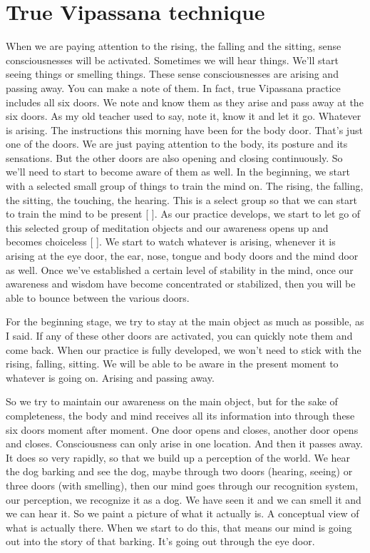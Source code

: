 \documentclass[letterpaper,10pt,english]{sphinxmanual}
\begin{document}
\section{True Vipassana technique}
\label{\detokenize{2-a:true-vipassana-technique}}
\sphinxAtStartPar
When we are paying attention to the rising, the falling and the sitting,
sense  consciousnesses  will  be  activated.  Sometimes  we  will  hear  things.
We’ll start seeing things or smelling things. These sense consciousnesses are
arising and passing away. You can make a note of them. In fact, true Vipassana practice includes all six doors. We note and know them as they arise and
pass away at the six doors. As my old teacher used to say, note it, know it and
let it go. Whatever is arising. The instructions this morning have been for the
body door. That’s just one of the doors. We are just paying attention to the
body, its posture and its sensations. But the other doors are also opening and
  closing continuously. So we’ll need to start to become aware of them as well.
In the beginning, we start with a selected small group of things to train the
mind on. The rising, the falling, the sitting, the touching, the hearing. This
is a select group so that we can start to train the mind to be present {[}
{]}. As our practice develops, we start to let go of this selected group
of meditation objects and our awareness opens up and becomes choiceless
{[}
{]}. We start to watch whatever is arising, whenever it
is arising at the eye door, the ear, nose, tongue and body doors and the mind
door as well. Once we’ve established a certain level of stability in the mind,
once  our  awareness  and  wisdom  have  become  concentrated  or  stabilized,
then you will be able to bounce between the various doors.

\sphinxAtStartPar
For the beginning stage, we try to stay at the main object as much as
possible, as I said. If any of these other doors are activated, you can quickly
note them and come back. When our practice is fully developed, we won’t
need to stick with the rising, falling, sitting. We will be able to be aware in
the present moment to whatever is going on. Arising and passing away.

\sphinxAtStartPar
So  we  try  to  maintain  our  awareness  on  the  main  object,  but  for  the
sake  of  completeness,  the  body  and  mind  receives  all  its  information  into
through these six doors moment after moment. One door opens and closes,
another  door  opens  and  closes.  Consciousness  can  only  arise  in  one  location. And then it passes away. It does so very rapidly, so that we build up a
perception of the world. We hear the dog barking and see the dog, maybe
through two doors (hearing, seeing) or three doors (with smelling), then our
mind goes through our recognition system, our perception, we recognize it
as a dog. We have seen it and we can smell it and we can hear it. So we paint
a picture of what it actually is. A conceptual view of what is actually there.
When we start to do this, that means our mind is going out into the story of
that barking. It’s going out through the eye door.
\end{document}
